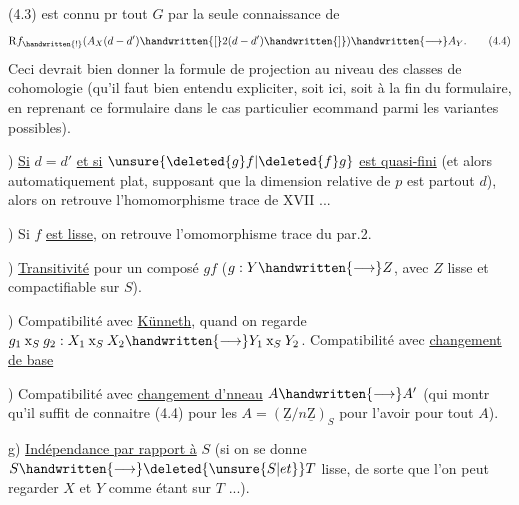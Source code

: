 (4.3) est connu p\textsuperscript{\handwritten{\unsure{/}}}r tout $G$ par la seule connaissance de
\[
\mathrm{R}f_{\handwritten{!}}(A_X(d-d')\handwritten{[}2(d-d')\handwritten{]})\handwritten{\longrightarrow}A_Y.
\tag*{(4.4)}
\]
Ceci devrait bien donner la formule de projection au niveau des classes de cohomologie (qu'il faut bien entendu expliciter, soit ici, soit à la fin du formulaire, en reprenant ce formulaire dans  le cas particulier ecommand\handwritten{,} parmi les variantes possibles).

) \uline{Si} $d=d'$ \uline{et si} $\unsure{\deleted{g}f|\deleted{f}g}$ \uline{est quasi-fini} (et alors automatiquement plat, supposant que la dimension relative de $p$ est partout $d$), alors on retrouve l'homomorphisme trace de XVII ...

) Si $f$ \uline{est lisse}, on retrouve l'omomorphisme trace du par.2.

) \uline{Transitivité} pour un composé $gf$ ($g:Y\handwritten{\longrightarrow}Z$, avec $Z$ lisse et compactifiable sur $S$).

) Compatibilité avec \uline{Künneth}, quand on regarde $g_1\mathbin{\mathrm{x}}_S g_2:X_1\mathbin{\mathrm{x}}_S X_2\handwritten{\longrightarrow}Y_1\mathbin{\mathrm{x}}_S Y_2$. Compatibilité avec \uline{changement de base}

) Compatibilité avec \uline{changement d'nneau} $A\handwritten{\longrightarrow}A'$ (qui montr qu'il suffit de connaitre (4.4) pour les $A=(\underline{\mathrm{Z}}/n\underline{\mathrm{Z}})_S$ pour l'avoir pour tout $A$).

g) \uline{Indépendance par rapport à} $S$ (si on se donne $S\handwritten{\longrightarrow}\deleted{\unsure{S|et}}T$ lisse, de sorte que l'on peut regarder $X$ et $Y$ comme étant sur $T$ ...).

